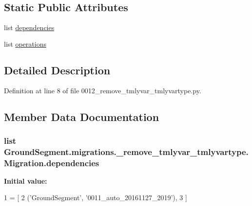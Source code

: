 \subsection*{Static Public Attributes}
\begin{DoxyCompactItemize}
\item 
list \hyperlink{class_ground_segment_1_1migrations_1_10012__remove__tmlyvar__tmlyvartype_1_1_migration_a453554cc4600600223224a8b857ee18b}{dependencies}
\item 
list \hyperlink{class_ground_segment_1_1migrations_1_10012__remove__tmlyvar__tmlyvartype_1_1_migration_a2fa6b18893856ca5bfaf50936d6baa0f}{operations}
\end{DoxyCompactItemize}


\subsection{Detailed Description}


Definition at line 8 of file 0012\+\_\+remove\+\_\+tmlyvar\+\_\+tmlyvartype.\+py.



\subsection{Member Data Documentation}
\hypertarget{class_ground_segment_1_1migrations_1_10012__remove__tmlyvar__tmlyvartype_1_1_migration_a453554cc4600600223224a8b857ee18b}{}
\subsubsection[{dependencies}]{\setlength{\rightskip}{0pt plus 5cm}list Ground\+Segment.\+migrations.\+\_\+remove\+\_\+tmlyvar\+\_\+tmlyvartype.\+Migration.\+dependencies\hspace{0.3cm}{\ttfamily [static]}}\label{class_ground_segment_1_1migrations_1_10012__remove__tmlyvar__tmlyvartype_1_1_migration_a453554cc4600600223224a8b857ee18b}
{\bfseries Initial value\+:}
\begin{DoxyCode}
1 = [
2         (\textcolor{stringliteral}{'GroundSegment'}, \textcolor{stringliteral}{'0011\_auto\_20161127\_2019'}),
3     ]
\end{DoxyCode}


